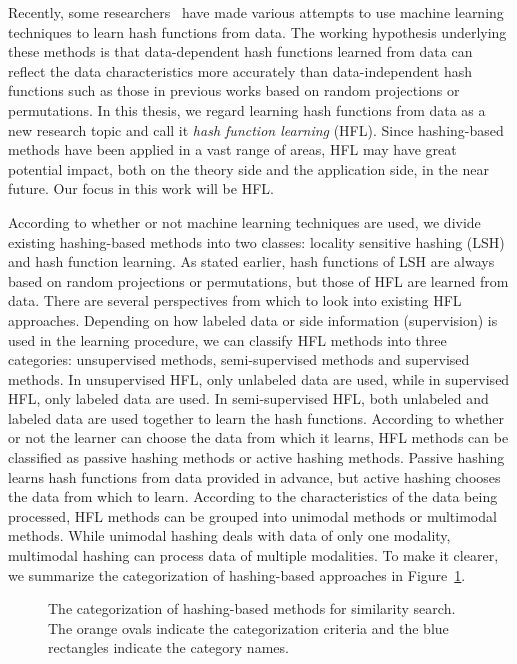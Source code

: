 Recently, some researchers~\cite{salakhutdinov2009ijar,weiss2008nips,kulis2009nips,wang2010icml,mu2010cvpr} have made various attempts to use machine learning techniques to learn hash functions from data.  The working hypothesis underlying these methods is that data-dependent hash functions learned from data can reflect the data characteristics more accurately than data-independent hash functions such as those in previous works based on random projections or permutations. In this thesis, we regard learning hash functions from data as a new research topic and call it \textit{hash function learning} (\mbox{HFL}). Since hashing-based methods have been applied in a vast range of areas, \mbox{HFL} may have great potential impact, both on the theory side and the application side, in the near future. Our focus in this work will be \mbox{HFL}.

According to whether or not machine learning techniques are used, we divide existing hashing-based methods into two classes: locality sensitive hashing (\mbox{LSH}) and hash function learning. As stated earlier, hash functions of \mbox{LSH} are always based on random projections or permutations, but those of \mbox{HFL} are learned from data. There are several perspectives from which to look into existing \mbox{HFL} approaches. Depending on how labeled data or side information (\aka supervision) is used in the learning procedure, we can classify \mbox{HFL} methods into three categories: unsupervised methods, semi-supervised methods and supervised methods. In unsupervised \mbox{HFL}, only unlabeled data are used, while in supervised \mbox{HFL}, only labeled data are used. In semi-supervised \mbox{HFL}, both unlabeled and labeled data are used together to learn the hash functions. According to whether or not the learner can choose the data from which it learns, \mbox{HFL} methods can be classified as passive hashing methods or active hashing methods. Passive hashing learns hash functions from data provided in advance, but active hashing chooses the data from which to learn. According to the characteristics of the data being processed, \mbox{HFL} methods can be grouped into unimodal methods or multimodal methods. While unimodal hashing deals with data of only one modality, multimodal hashing can process data of multiple modalities. To make it clearer, we summarize the categorization of hashing-based approaches in Figure~\ref{fig:intro:HashingCat}.

\begin{figure}[htb]
\centering
\vspace{-0.5cm}
\vspace{-3cm}
\caption{The categorization of hashing-based methods for similarity search. The orange ovals indicate the categorization criteria and the blue rectangles indicate the category names.}\label{fig:intro:HashingCat}
\end{figure}


